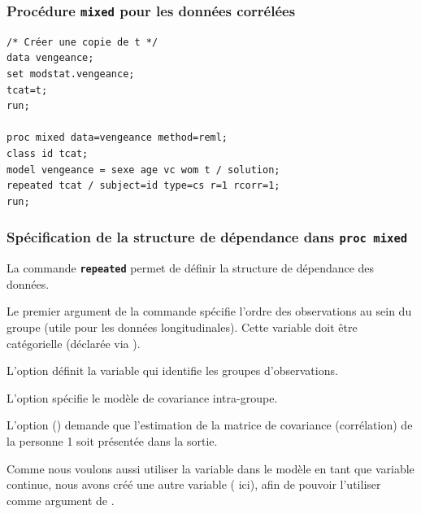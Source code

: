 \documentclass{beamer}
\begin{document}
 \begin{frame}[fragile]
\frametitle{Procédure \texttt{mixed} pour les données corrélées}

\begin{tcolorbox}[colback=white, colframe=hecblue, title=Code SAS pour ajuster le modèle d'équicorrélation]
\begin{verbatim}
/* Créer une copie de t */
data vengeance; 
set modstat.vengeance; 
tcat=t; 
run;

proc mixed data=vengeance method=reml; 
class id tcat; 
model vengeance = sexe age vc wom t / solution; 
repeated tcat / subject=id type=cs r=1 rcorr=1; 
run;
\end{verbatim}
\end{tcolorbox}
\end{frame}
\begin{frame}
\frametitle{Spécification de la structure de dépendance dans \texttt{proc mixed}}
La commande \texttt{\textbf{repeated}} permet de définir la structure de dépendance des données.
\bi
\item Le premier argument de la commande  spécifie l'ordre des observations au sein du groupe (utile pour les données longitudinales). Cette variable doit être catégorielle (déclarée via ).
\item L'option   définit la variable qui identifie les groupes d'observations. 
\item L'option  spécifie le modèle de covariance intra-groupe. 
\item L'option  () demande que l'estimation de la matrice de covariance (corrélation) de la personne 1 soit présentée dans la sortie.
\ei
{\footnotesize 
Comme nous voulons aussi utiliser la variable  dans le modèle en tant que variable continue, nous avons créé une autre variable  ( ici), afin de pouvoir l'utiliser comme argument de  . 

}
\end{frame}
% 
% 
% 
\end{document}

